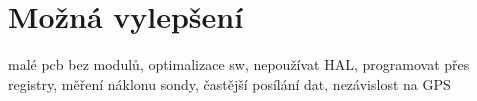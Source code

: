 \documentclass[twoside]{ctuthesis}
\theoremstyle{plain}
\theoremstyle{definition}
\theoremstyle{note}
\begin{document}
	\section{Možná vylepšení}
	malé pcb bez modulů, optimalizace sw, nepoužívat HAL, programovat přes registry, měření náklonu sondy, častější posílání dat, nezávislost na GPS

	
















	


\appendix

\printindex

\appendix




\end{document}
